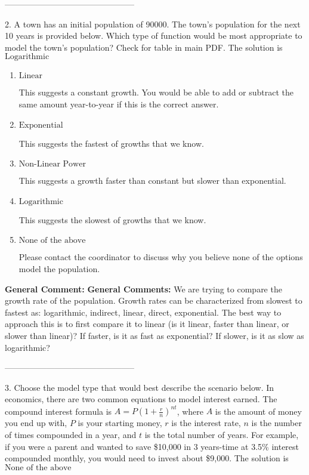 \documentclass{extbook}[14pt]
\begin{document}
-----------------------------------------------

2. A town has an initial population of 90000. The town's population for the next 10 years is provided below. Which type of function would be most appropriate to model the town's population?
Check for table in main PDF. 
The solution is $ \text{Logarithmic} $ 

\begin{enumerate}[label=\Alph*.] 
\item $ \text{Linear} $ 

 This suggests a constant growth. You would be able to add or subtract the same amount year-to-year if this is the correct answer. 
\item $ \text{Exponential} $ 

 This suggests the fastest of growths that we know. 
\item $ \text{Non-Linear Power} $ 

 This suggests a growth faster than constant but slower than exponential. 
\item $ \text{Logarithmic} $ 

 This suggests the slowest of growths that we know. 
\item $ \text{None of the above} $ 

 Please contact the coordinator to discuss why you believe none of the options model the population. 
\end{enumerate} 
 
\textbf{General Comment:} \textbf{General Comments:} We are trying to compare the growth rate of the population. Growth rates can be characterized from slowest to fastest as: logarithmic, indirect, linear, direct, exponential. The best way to approach this is to first compare it to linear (is it linear, faster than linear, or slower than linear)? If faster, is it as fast as exponential? If slower, is it as slow as logarithmic? 

-----------------------------------------------

3. Choose the model type that would best describe the scenario below.
In economics, there are two common equations to model interest earned. The compound interest formula is $A = P (1 + \frac{r}{n})^{nt}$, where $A$ is the amount of money you end up with, $P$ is your starting money, $r$ is the interest rate, $n$ is the number of times compounded in a year, and $t$ is the total number of years. For example, if you were a parent and wanted to save \$10,000 in 3 years-time at 3.5\% interest compounded monthly, you would need to invest about \$9,000. 
The solution is $ \text{None of the above} $ 
\end{document}

